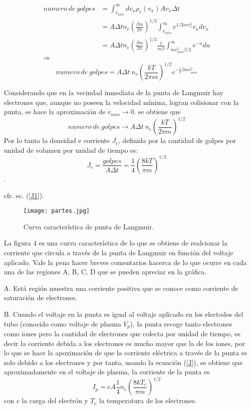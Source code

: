 \documentclass[letterpaper,12pt]{article}
\begin{document}
\begin{equation*}
\begin{split}
numero \ de \ golpes &= \int_{v_{min}}^{\infty}dv_x\rho_e(v_x) A v_x \Delta t \\
&=A\Delta t n_e \left( \frac{\beta m}{2\pi} \right) ^{1/2 } \int_{v_{min}}^{\infty} e^{1/2 m v_x^2}v_x dv_x \\
&=A\Delta t  n_e \left( \frac{\beta m}{2\pi} \right) ^{1/2 } \frac{1}{m\beta} \int_{mv_{min}^2\beta/2}^{\infty}e^{-u}du\\
\Rightarrow
\end{split}
\end{equation*}
\begin{equation}\label{golpes}
numero \ de \ golpes = A \Delta t \ n_e \left( \frac{kT}{2\pi m} \right)^{1/2} e^{-\frac{1}{2}\beta mv_{min}^2}
\end{equation}

Considerando que en la vecindad inmediata de la punta de Langmuir hay electrones que, aunque no poseen la velocidad mínima, logran colisionar con la punta, se hace la aproximación de $v_{min}\rightarrow 0$.
se obtiene que $$ numero \ de \ golpes \rightarrow A \Delta t \ n_e  \left( \frac{kT}{2\pi m} \right)^{1/2} $$
Por lo tanto la densidad e corriente $J_e$, definida por la cantidad de golpes  por unidad de volumen por unidad de tiempo es:
\begin{equation}\label{J} 
J_e=\frac{golpes}{A	\Delta t}=\frac{1}{4}\left(\frac{8kT}{\pi m} \right) ^{1/2} 
\end{equation}.

cfr. ec. (\ref{J1}).
\begin{figure}[!h]
\centering
\texttt{[image: partes.jpg]}
\caption{Curva característica de punta de Langmuir.}
\end{figure}

La figura 4 es una curva característica de lo que se obtiene de realcionar la corriente que circula a través de la punta de Langmuir en función del voltaje aplicado. Vale la pena hacer breves comentarios hacerca de lo que ocurre en cada una de las regiones A, B, C, D que se pueden apreciar en la gráfica.

A. Está región muestra una corriente positiva que se conoce como corriente de saturación de electrones.

B. Cuando el voltaje en la punta es igual al voltaje aplicado en los electodos del tubo (conocido como voltaje de plasma $V_p$), la punta recoge tanto electrones como iones pero la cantidad de electrones que colecta por unidad de tiempo, es decir la corriente debida a los electrones es mucho mayor que la de los iones, por lo que se hace la apoximación de que la corriente eléctrica a través de la punta es solo debido a los electrones y por tanto, usando la ecuación (\ref{J}), se obtiene que aproximadamente en el voltaje de plasma, la corriente de la punta es 
\begin{equation}\label{corriente}
I_p=eA\frac{1}{4}n_e\left(\frac{8kT_e}{\pi m} \right) ^{1/2}
\end{equation}
con $e$ la carga del electrón y $T_e$ la temperatura de los electrones.
\end{document}
